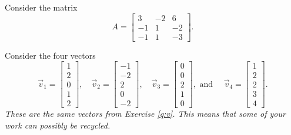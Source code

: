 \documentclass[addpoints]{exam}
\begin{document}
\begin{questions}

\question Consider the matrix
\[A = \begin{bmatrix}
3 & -2 & 6 \\
-1 & 1 & -2 \\
-1 & 1 & -3
\end{bmatrix}.\]

\question Consider the four vectors
\[\vec v_1 = \begin{bmatrix} 1 \\ 2 \\ 0 \\ 1 \\ 2 \end{bmatrix},\quad
\vec v_2 = \begin{bmatrix} -1 \\ -2 \\ 2 \\ 0 \\ -2 \end{bmatrix},\quad
\vec v_3 = \begin{bmatrix} 0 \\ 0 \\ 2 \\ 1 \\ 0 \end{bmatrix}, \text{ and } \quad
\vec v_4 = \begin{bmatrix} 1 \\ 2 \\ 2 \\ 3 \\ 4 \end{bmatrix}.\]
\textit{These are the same vectors from Exercise \ref{q:v}. This means that some of your work can possibly be recycled.}
\begin{parts}

\end{parts}
\end{questions}
\end{document}
